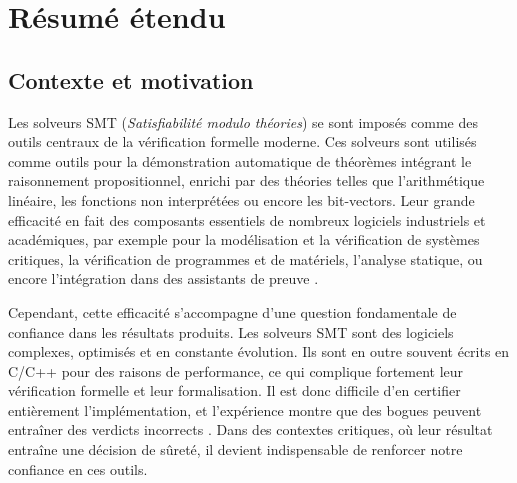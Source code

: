 \chapter*{Résumé étendu}
\label{chap:resume-etendu}

\theoremstyle{definition}
\newtheorem*{definition*}{Définition}
\newtheorem*{theorem*}{Théorème}
\newtheorem*{exemple*}{Exemple}

\captionsetup[figure]{list=no}
\captionsetup[table]{list=no}
\captionsetup[lstlisting]{list=no}
\renewcommand{\tablename}{Tableau}
\renewcommand{\figurename}{Image}
\renewcommand{\lstlistingname}{Code}

\section*{Contexte et motivation}
\label{sec:contexte-et-motivation}

Les solveurs SMT (\emph{Satisfiabilité modulo théories}) \cite{cvc5,verit} se sont imposés comme des outils centraux de la vérification formelle moderne.
Ces solveurs sont utilisés comme outils pour la démonstration automatique de théorèmes intégrant le raisonnement propositionnel, enrichi par des théories telles que l’arithmétique linéaire, les fonctions non interprétées ou encore les bit-vectors.
Leur grande efficacité en fait des composants essentiels de nombreux logiciels industriels et académiques, par exemple pour la modélisation et la vérification de systèmes critiques, la vérification de programmes et de matériels, l’analyse statique, ou encore l’intégration dans des assistants de preuve \cite{smtcoq,lean-smt}.


Cependant, cette efficacité s’accompagne d’une question fondamentale de confiance dans les résultats produits.
Les solveurs SMT sont des logiciels complexes, optimisés et en constante évolution.
Ils sont en outre souvent écrits en C/C++ pour des raisons de performance, ce qui complique fortement leur vérification formelle et leur formalisation.
Il est donc difficile d’en certifier entièrement l’implémentation, et l’expérience montre que des bogues peuvent entraîner des verdicts incorrects \cite{bugsmt}.
Dans des contextes critiques, où leur résultat entraîne une décision de sûreté, il devient indispensable de renforcer notre confiance en ces outils.

